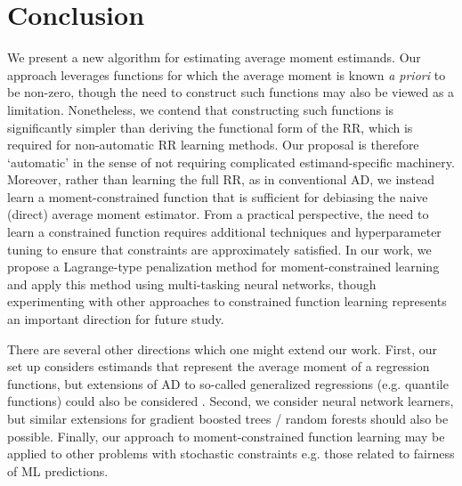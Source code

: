 \section{Conclusion}

We present a new algorithm for estimating average moment estimands.
Our approach leverages functions for which the average moment is known \emph{a priori} to be non-zero, though the need to construct such functions may also be viewed as a limitation. Nonetheless, we contend that constructing such functions is significantly simpler than deriving the functional form of the RR, which is required for non-automatic RR learning methods. Our proposal is therefore `automatic' in the sense of not requiring complicated estimand-specific machinery. Moreover, rather than learning the full RR, as in conventional AD, we instead learn a moment-constrained function that is sufficient for debiasing the naive (direct) average moment estimator. From a practical perspective, the need to learn a constrained function requires additional techniques and hyperparameter tuning to ensure that constraints are approximately satisfied. In our work, we propose a Lagrange-type penalization method for moment-constrained learning and apply this method using multi-tasking neural networks, though experimenting with other approaches to constrained function learning represents an important direction for future study.

There are several other directions which one might extend our work. First, our set up considers estimands that represent the average moment of a regression functions, but extensions of AD to so-called generalized regressions (e.g. quantile functions) could also be considered \citep{Chernozhukov2021}. %
Second, we consider neural network learners, but similar extensions for gradient boosted trees / random forests should also be possible. %
Finally, our approach to moment-constrained function learning may be applied to other problems with stochastic constraints e.g. those related to fairness of ML predictions.


